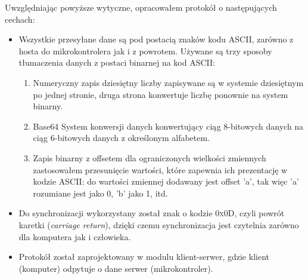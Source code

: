 Uwzględniając powyższe wytyczne, opracowałem protokół o następujących cechach:
\begin{itemize}
 \item Wszystkie przesyłane dane są pod postacią znaków kodu ASCII, zarówno z hosta do mikrokontrolera jak i z powrotem. Używane są trzy sposoby tłumaczenia danych z postaci binarnej na kod ASCII:
 \begin{enumerate}
  \item Numeryczny zapis dziesiętny \pauza liczby zapisywane są w systemie dziesiętnym po jednej stronie, druga strona konwertuje liczbę ponownie na system binarny.
  \item Base64 \pauza System konwersji danych konwertujący ciąg 8-bitowych danych na ciąg 6-bitowych danych z określonym alfabetem.
  \item Zapis binarny z offsetem \pauza dla ograniczonych wielkości zmiennych zastosowałem przesunięcie wartości, które zapewnia ich prezentację w kodzie ASCII: do wartości zmiennej dodawany jest offset 'a', tak więc 'a' rozumiane jest jako 0, 'b' jako 1, itd.
 \end{enumerate}
 \item Do synchronizacji wykorzystany został znak o kodzie \textsc{0x0D}, czyli powrót karetki (\textit{carriage return}), dzięki czemu synchronizacja jest czytelnia zarówno dla komputera jak i człowieka.
 \item Protokół został zaprojektowany w modulu klient-serwer, gdzie klient (komputer) odpytuje o dane serwer (mikrokontroler).\\
\end{itemize}
